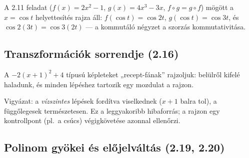 \documentclass[11pt,a4paper]{article}
\theoremstyle{definition}
\begin{document}
\noindent A 2.11 feladat ($f(x)=2x^2-1$, $g(x)=4x^3-3x$, $f\circ g=g\circ f$) mögött a
$x=\cos t$ helyettesítés rajza áll: $f(\cos t)=\cos 2t$, $g(\cos t)=\cos 3t$, és
$\cos 2(3t)=\cos 3(2t)$ --- a kommutáló négyzet a szorzás kommutativitása.

\begin{center}
\end{center}

\subsection{Transzformációk sorrendje (2.16)}

A $-2(x+1)^2+4$ típusú képleteket „recept-fának” rajzoljuk: belülről kifelé haladunk,
és minden lépéshez tartozik egy mozdulat a rajzon.

\begin{center}
\end{center}

\noindent Vigyázat: a \emph{vízszintes} lépések fordítva viselkednek ($x+1$ balra tol),
a függőlegesek természetesen. Ez a leggyakoribb hibaforrás; a rajzon egy kontrollpont
(pl.\ a csúcs) végigkövetése azonnal ellenőrzi.

\subsection{Polinom gyökei és előjelváltás (2.19, 2.20)}
\end{document}
